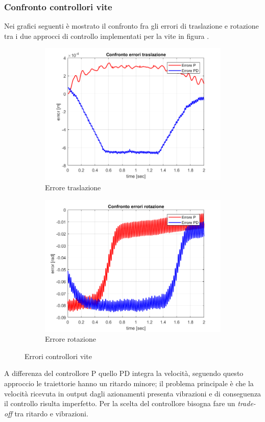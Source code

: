\subsubsection{Confronto controllori vite}	
Nei grafici seguenti è mostrato il confronto fra gli errori di traslazione e rotazione tra i due approcci di controllo implementati per la vite in figura \label{fig:errVite}.
\begin{figure}
	\begin{subfigure}{.5\textwidth}
		\includegraphics[width=1\linewidth]{Immagini/Traiettorie/errTras}  
		\caption{Errore traslazione}
		\label{fig:sub-errT}
	\end{subfigure}
	\begin{subfigure}{.5\textwidth}
		\includegraphics[width=1\linewidth]{Immagini/Traiettorie/errRot}  
		\caption{Errore rotazione}
		\label{fig:sub-errR}
	\end{subfigure}
	\caption{Errori controllori vite}
	\label{fig:errVite0}
\end{figure}
A differenza del controllore P quello PD integra la velocità, seguendo questo approccio le traiettorie hanno un ritardo minore; il problema principale è che la velocità ricevuta in output dagli azionamenti presenta vibrazioni e di conseguenza il controllo risulta imperfetto. Per la scelta del controllore bisogna fare un \textit{trade-off} tra ritardo e vibrazioni.
